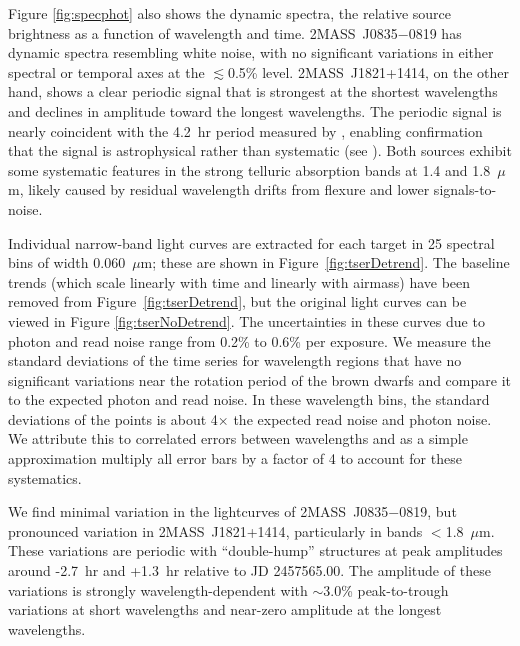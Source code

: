 \documentclass[twocolumn]{aastex6}
\newcommand{\sha}{2MASS~J0835$-$0819}
\newcommand{\shb}{2MASS~J1821+1414}
\begin{document}
Figure \ref{fig:specphot} also shows the dynamic spectra, the relative source brightness as a function of wavelength and time.
{\sha} has dynamic spectra resembling white noise, with no significant variations in either spectral or temporal axes at the $\lesssim$0.5\% level.
{\shb}, on the other hand, shows a clear periodic signal that is strongest at the shortest wavelengths and declines in amplitude toward the longest wavelengths. The periodic signal is nearly coincident with the 4.2~hr period measured by \citet{2015ApJ...799..154M}, enabling confirmation that the signal is astrophysical rather than systematic (see \citealt{2016ApJ...826..156S}).
Both sources exhibit some systematic features in the strong telluric absorption bands at 1.4 and 1.8~$\mu$m, likely caused by residual wavelength drifts from flexure and lower signals-to-noise.

Individual narrow-band light curves are extracted for each target in 25 spectral bins of width 0.060~$\mu$m; these are shown in Figure~\ref{fig:tserDetrend}.
The baseline trends (which scale linearly with time and linearly with airmass) have been removed from Figure~\ref{fig:tserDetrend}, but the original light curves can be viewed in Figure \ref{fig:tserNoDetrend}.
The uncertainties in these curves due to photon and read noise range from 0.2\% to 0.6\% per exposure.
We measure the standard deviations of the time series for wavelength regions that have no significant variations near the rotation period of the brown dwarfs and compare it to the expected photon and read noise.
In these wavelength bins, the standard deviations of the points is about 4$\times$ the expected read noise and photon noise.
We attribute this to correlated errors between wavelengths and as a simple approximation multiply all error bars by a factor of 4 to account for these systematics.

We find minimal variation in the lightcurves of {\sha}, but pronounced variation in {\shb}, particularly in bands $<$1.8~$\mu$m. 
These variations are periodic with ``double-hump'' structures at peak amplitudes around -2.7~hr and +1.3~hr relative to JD 2457565.00.
The amplitude of these variations is strongly wavelength-dependent with $\sim$3.0\% peak-to-trough variations at short 
wavelengths and near-zero amplitude at the longest wavelengths.
\end{document}
